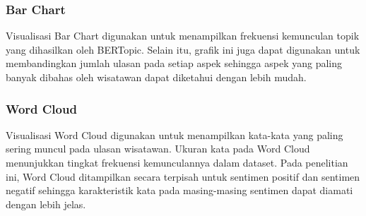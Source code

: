 \subsubsection{Bar Chart}

Visualisasi Bar Chart digunakan untuk menampilkan frekuensi kemunculan topik yang dihasilkan oleh BERTopic. Selain itu, grafik ini juga dapat digunakan untuk membandingkan jumlah ulasan pada setiap aspek sehingga aspek yang paling banyak dibahas oleh wisatawan dapat diketahui dengan lebih mudah.

\subsubsection{Word Cloud}

Visualisasi Word Cloud digunakan untuk menampilkan kata-kata yang paling sering muncul pada ulasan wisatawan. Ukuran kata pada Word Cloud menunjukkan tingkat frekuensi kemunculannya dalam dataset. Pada penelitian ini, Word Cloud ditampilkan secara terpisah untuk sentimen positif dan sentimen negatif sehingga karakteristik kata pada masing-masing sentimen dapat diamati dengan lebih jelas.